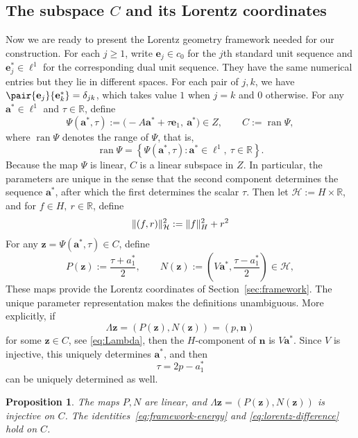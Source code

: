 \documentclass[11pt,a4paper]{article}
\theoremstyle{reportstyle}
\newtheorem{proposition}[lemma]{Proposition}
\numberwithin{equation}{section}
\DeclareMathOperator{\ran}{ran}
\newcommand{\R}{\mathbb R}
\newcommand{\HH}{\mathcal H}
\newcommand{\ba}{\mathbf a}
\newcommand{\be}{\mathbf e}
\newcommand{\bn}{\mathbf n}
\newcommand{\bz}{\mathbf z}
\DeclarePairedDelimiter{\norm}{\lVert}{\rVert}
\begin{document}
	\subsection{The subspace \texorpdfstring{$C$}{C} and its Lorentz coordinates}
	\label{subsec:carrier}
	Now we are ready to present the Lorentz geometry framework needed for our construction. For each $j\ge1$, write $\be_j\in c_0$ for the $j$th standard unit
	sequence and $\be_j^*\in\ell^1$ for the corresponding dual unit sequence.
	They have the same numerical entries but they lie in different spaces. For each pair of $j,k$, we have
	$\pair{\be_j}{\be_k^*}=\delta_{jk}$, which takes value $1$ when $j = k$ and $0$ otherwise. For any $\ba^*\in\ell^1$ and $\tau\in\R$, define
	\begin{equation*}
		\Psi(\ba^*,\tau) :=\bigl(-A\ba^*+\tau\be_1,\ \ba^*\bigr)\in Z, \qquad C:=\ran\Psi,
	\end{equation*}
	where $\operatorname{ran}\Psi$ denotes the range of $\Psi$, that is,
	$$ \operatorname{ran}\Psi = \left\{ \Psi(\mathbf a^*,\tau): \mathbf a^*\in \ell^1,\ \tau\in\mathbb R
	\right\}. $$
	Because the map $\Psi$ is linear, $C$ is a linear subspace in $Z$. In particular, the parameters
	are unique in the sense that the second component determines the sequence $\ba^*$, after which the first determines the scalar $\tau$. Then let $\HH:=H\times\R$, and for $f\in H,\ r\in\R$, define
	$$ \norm{(f,r)}_{\HH}^2:=\norm{f}_H^2+r^2 $$
	For any $\bz=\Psi(\ba^*,\tau)\in C$, define
	\begin{equation}
		P(\bz):=\frac{\tau+a_1^*}{2}, \qquad N(\bz):=\left(V\ba^*,\frac{\tau-a_1^*}{2}\right)\in\HH,
		\label{eq:coordinates}
	\end{equation}
	These maps provide the Lorentz coordinates of
	Section~\ref{sec:framework}. The unique parameter representation makes
	the definitions unambiguous. More explicitly, if
	$$\Lambda \bz= (P(\bz),N(\bz)) = (p,\bn)$$
	for some $\mathbf z\in C$, see \eqref{eq:Lambda}, then the $H$-component of $\mathbf n$ is
	$V\mathbf a^*$. Since $V$ is injective, this uniquely determines
	$\mathbf a^*$, and then
	$$\tau = 2p-a_1^*$$
	can be uniquely determined as well.

	\begin{proposition}
		\label{prop:lorentz}
		The maps $P,N$ are linear, and $\Lambda \bz=(P(\bz),N(\bz))$ is injective on $C$. The identities~\eqref{eq:framework-energy} and
		\eqref{eq:lorentz-difference} hold on $C$.
	\end{proposition}
\end{document}
